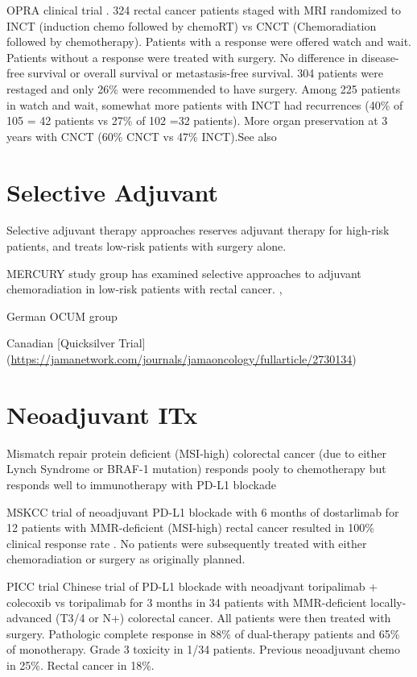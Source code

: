 \documentclass[
]{book}
\begin{document}
OPRA clinical trial \citep{garcia-aguilar2546}. 324 rectal cancer patients staged with MRI randomized to INCT (induction chemo followed by chemoRT) vs CNCT (Chemoradiation followed by chemotherapy). Patients with a response were offered watch and wait. Patients without a response were treated with surgery. No difference in disease-free survival or overall survival or metastasis-free survival. 304 patients were restaged and only 26\% were recommended to have surgery. Among 225 patients in watch and wait, somewhat more patients with INCT had recurrences (40\% of 105 = 42 patients vs 27\% of 102 =32 patients). More organ preservation at 3 years with CNCT (60\% CNCT vs 47\% INCT).See also \citep{smith767}

\hypertarget{selective-adjuvant}{%
\section{Selective Adjuvant}\label{selective-adjuvant}}

Selective adjuvant therapy approaches reserves adjuvant therapy for high-risk patients, and treats low-risk patients with surgery alone.

MERCURY study group has examined selective approaches to adjuvant chemoradiation in low-risk patients with rectal cancer. \citep{taylor711}, \citep{strassburg2790}

German OCUM group \citep{kreis25} \citep{ruppert1519}

Canadian {[}Quicksilver Trial{]} (\url{https://jamanetwork.com/journals/jamaoncology/fullarticle/2730134})

\hypertarget{neoadjuvant-itx}{%
\section{Neoadjuvant ITx}\label{neoadjuvant-itx}}

Mismatch repair protein deficient (MSI-high) colorectal cancer (due to either Lynch Syndrome or BRAF-1 mutation) responds pooly to chemotherapy but responds well to immunotherapy with PD-L1 blockade

MSKCC trial of neoadjuvant PD-L1 blockade with 6 months of dostarlimab for 12 patients with MMR-deficient (MSI-high) rectal cancer resulted in 100\% clinical response rate \citep{cercek2363}. No patients were subsequently treated with either chemoradiation or surgery as originally planned.

PICC trial \citep{hu38} Chinese trial of PD-L1 blockade with neoadjvant toripalimab + colecoxib vs toripalimab for 3 months in 34 patients with MMR-deficient locally-advanced (T3/4 or N+) colorectal cancer. All patients were then treated with surgery. Pathologic complete response in 88\% of dual-therapy patients and 65\% of monotherapy. Grade 3 toxicity in 1/34 patients. Previous neoadjuvant chemo in 25\%. Rectal cancer in 18\%.
\end{document}
